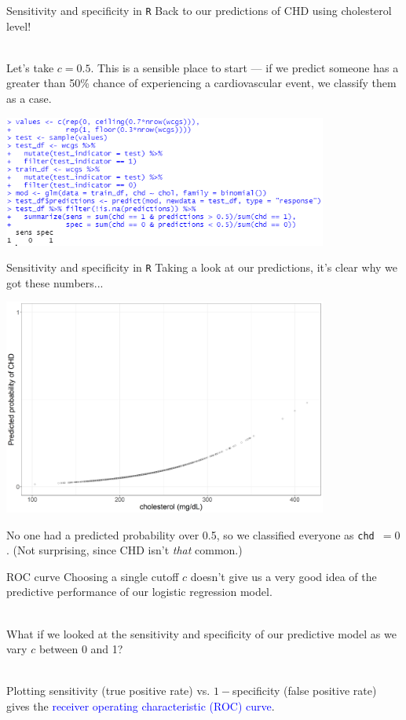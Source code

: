 \documentclass[10pt,t]{beamer}
\begin{document}
\begin{frame}{Sensitivity and specificity in \texttt{R}}
	Back to our predictions of CHD using cholesterol level!
	\\ ~\ 
	
	Let's take $c =0.5$. This is a sensible place to start --- if we predict someone has a greater than 50\% chance of experiencing a cardiovascular event, we classify them as a case. 
    \begin{center}
	\includegraphics[width=0.8\textwidth]{./figs/sensitivity_specificity_code}
	\end{center}

\end{frame}

\begin{frame}{Sensitivity and specificity in \texttt{R}}
	\vspace{-0.5cm}
	Taking a look at our predictions, it's clear why we got these numbers...
			\begin{center}
		\includegraphics[width=0.8\textwidth]{./figs/glm_test_predictions}
	\end{center}
	No one had a predicted probability over 0.5, so we classified everyone as \texttt{chd }$ = 0$. (Not surprising, since CHD isn't \textit{that} common.)
\end{frame}

\begin{frame}{ROC curve}
	Choosing a single cutoff $c$ doesn't give us a very good idea of the predictive performance of our logistic regression model. 
	\\ ~\
	
	What if we looked at the sensitivity and specificity of our predictive model as we vary $c$ between 0 and 1? 
	\\ ~\ 
	
	Plotting sensitivity (true positive rate) vs. $1-$specificity (false positive rate) gives the \textcolor{blue}{receiver operating characteristic (ROC) curve}. 
\end{frame}
\end{document}
